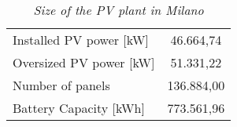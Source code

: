 \begin{table}[hp]
\centering
\begin{tabular}{|l|c|}
\hline
\rowcolor{bluepoli!40}\multicolumn{2}{|c|}{\cellcolor{bluepoli!40}\textbf{PV Plant Sizing}} \\ \hline
Installed PV power [kW] & 46.664,74                            \\ \hline
Oversized PV power [kW] & 51.331,22                            \\ \hline
Number of panels        & 136.884,00                            \\ \hline
Battery Capacity [kWh]  & 773.561,96                           \\ \hline
\end{tabular}
\caption{\textit{Size of the PV plant in Milano}}
\label{tab:sizepvmilano}
\end{table}